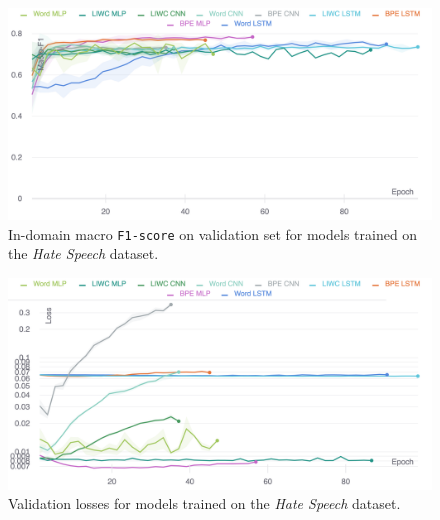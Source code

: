 \begin{figure}
    \centering
    \includegraphics[width=\textwidth]{waseem_hovy_dev_f1.pdf}
    \caption{In-domain macro \texttt{F1-score} on validation set for models trained on the \textit{Hate Speech} dataset.}
    \label{fig:waseem_hovy_dev_f1}
\end{figure}
\begin{figure}
    \centering
    \includegraphics[width=\textwidth]{waseem_hovy_dev_loss_stderr_logscale.pdf}
    \caption{Validation losses for models trained on the \textit{Hate Speech} dataset.}
    \label{fig:waseem_hovy_dev_loss}
\end{figure}

